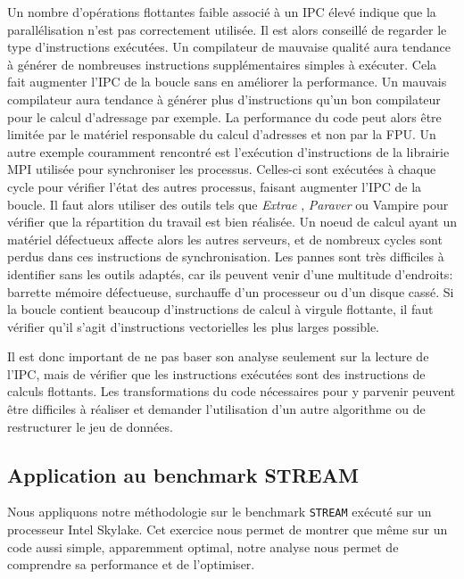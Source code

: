             Un nombre d'opérations flottantes faible associé à un IPC élevé indique que la parallélisation n'est pas correctement utilisée. Il est alors conseillé de regarder le type d'instructions exécutées.
                Un compilateur de mauvaise qualité aura tendance à générer de nombreuses instructions supplémentaires simples à exécuter. Cela fait augmenter l'IPC de la boucle sans en améliorer la performance. Un mauvais compilateur aura tendance à générer plus d'instructions qu'un bon compilateur pour le calcul d'adressage par exemple. La performance du code peut alors être limitée par le matériel responsable du calcul d'adresses et non par la \gls{FPU}.
                Un autre exemple couramment rencontré est l'exécution d'instructions de la librairie \gls{MPI} utilisée pour synchroniser les processus. Celles-ci sont exécutées à chaque cycle pour vérifier l'état des autres processus, faisant augmenter l'IPC de la boucle. Il faut alors utiliser des outils tels que \textit{Extrae} \cite{Rodriguez}, \textit{Paraver} ou Vampire \cite{Nagel1996, brunst2013custom} pour vérifier que la répartition du travail est bien réalisée. Un noeud de calcul ayant un matériel défectueux affecte alors les autres serveurs, et de nombreux cycles sont perdus dans ces instructions de synchronisation. Les pannes sont très difficiles à identifier sans les outils adaptés, car ils peuvent venir d'une multitude d'endroits: barrette mémoire défectueuse, surchauffe d'un processeur ou d'un disque cassé.
                Si la boucle contient beaucoup d'instructions de calcul à virgule flottante, il faut vérifier qu'il s'agit d'instructions vectorielles les plus larges possible.
            
            Il est donc important de ne pas baser son analyse seulement sur la lecture de l'IPC, mais de vérifier que les instructions exécutées sont des instructions de calculs flottants. Les transformations du code nécessaires pour y parvenir peuvent être difficiles à réaliser et demander l'utilisation d'un autre algorithme ou de restructurer le jeu de données.
            


\subsection{Application au benchmark STREAM}

    Nous appliquons notre méthodologie sur le benchmark \verb|STREAM| exécuté sur un processeur Intel Skylake. Cet exercice nous permet de montrer que même sur un code aussi simple, apparemment optimal, notre analyse nous permet de comprendre sa performance et de l'optimiser.
    
